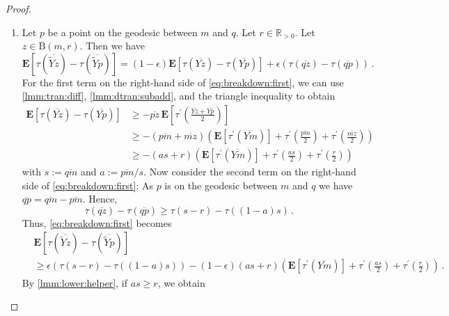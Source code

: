 \documentclass{article}
\newcommand{\R}{\mathbb{R}}
\newcommand{\Rpp}{\R_{>0}}
\newcommand{\ball}{\mathrm{B}}
\newcommand{\lab}{\left[} %
\newcommand{\rab}{\right]} %
\newcommand{\ab}[1]{\lab #1 \rab} %
\newcommand{\abOf}[1]{\!\ab{#1}} %
\newcommand{\lb}{\left(} %
\newcommand{\rb}{\right)} %
\newcommand{\br}[1]{\lb #1 \rb} %
\newcommand{\brOf}[1]{\!\br{#1}} %
\newcommand{\E}{\mathbf{E}} %
\newcommand{\EOf}[1]{\E\abOf{#1}}
\newcommand{\pr}{^\prime}
\newcommand{\eqfs}{\,.}
\newcommand{\ol}[2]{\overline{#1#2}}
\newcommand{\tran}{\tau}
\newcommand{\dtran}{\tau\pr}
\newcommand{\ballclosed}{\overline{\ball}}
\begin{document}
\begin{proof}
    \begin{enumerate}[label=(\roman*)]
        \item
        Let $p$ be a point on the geodesic between $m$ and $q$.
        Let $r\in\Rpp$.
        Let $z\in \ballclosed(m,r)$. Then we have
        \begin{equation}\label{eq:breakdown:first}
            \EOf{\tran(\ol {\tilde Y}z) - \tran(\ol {\tilde Y}p)}
            =
            (1-\epsilon)\EOf{\tran(\ol {Y}z) - \tran(\ol {Y}p)}
            +
            \epsilon\br{\tran(\ol qz) - \tran(\ol qp)}
            \eqfs
        \end{equation}
        For the first term on the right-hand side of \eqref{eq:breakdown:first}, we can use \cref{lmm:tran:diff}, \cref{lmm:dtran:subadd}, and the triangle inequality to obtain
        \begin{align}
            \EOf{\tran(\ol {Y}z) - \tran(\ol {Y}p)}
            &\geq
            - \ol pz\, \EOf{\dtran\brOf{\frac{\ol {Y}z + \ol {Y}p}2}}
            \\&\geq
            - \br{\ol pm + \ol mz}\br{\EOf{\dtran\brOf{\ol {Y}m}} + \dtran\brOf{\frac{\ol pm}2}+ \dtran\brOf{\frac{\ol mz}2}}
            \\&\geq
            - \br{as + r}\br{\EOf{\dtran\brOf{\ol {Y}m}} + \dtran\brOf{\frac{as}2}+ \dtran\brOf{\frac{r}2}}
        \end{align}
        with $s := \ol qm$ and $a := \ol pm/s$. 
        Now consider the second term on the right-hand side of \eqref{eq:breakdown:first}:
        As $p$ is on the geodesic between $m$ and $q$ we have $\ol qp = \ol qm - \ol pm$. Hence,
        \begin{equation}
            \tran(\ol qz) - \tran(\ol qp) \geq\tran(s-r)  -\tran((1-a)s) 
            \eqfs
        \end{equation}
        Thus, \eqref{eq:breakdown:first} becomes
        \begin{align}
            &\EOf{\tran(\ol {\tilde Y}z) - \tran(\ol {\tilde Y}p)}
            \\&\geq
            \epsilon \br{\tran(s-r) - \tran((1-a)s)}
            - (1-\epsilon) \br{as + r}\br{\EOf{\dtran\brOf{\ol {Y}m}} + \dtran\brOf{\frac{as}2}+ \dtran\brOf{\frac{r}2}}
            \eqfs
        \end{align}
        By \cref{lmm:lower:helper}, if $as \geq r$, we obtain 
        \begin{equation}\label{eq:lmm:general:lower:pre3bounds}

\end{equation}
\end{enumerate}
\end{proof}
\end{document}
